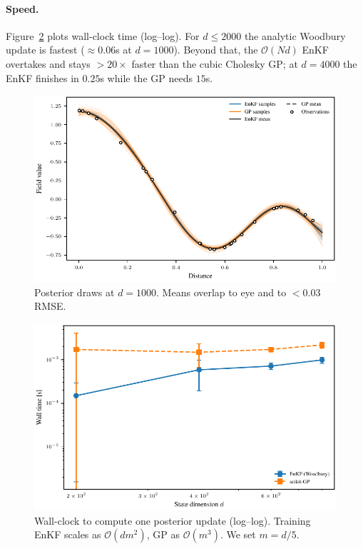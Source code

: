 \documentclass[runningheads]{llncs}
\begin{document}
\paragraph{Speed.}
Figure~\ref{fig:posterior-timing} plots wall-clock time (log–log).
For $d\le2000$ the analytic Woodbury update is fastest
($\!\approx\!0.06$s at $d=1000$).  Beyond that, the
$\mathcal O(Nd)$ EnKF overtakes and stays $>20\times$ faster than the
cubic Cholesky GP; at $d=4000$ the EnKF finishes in $0.25$s while the
GP needs $15$s.

\begin{figure}
  \centering
  \includegraphics[width=\linewidth]{fig_posterior_samples.pdf}
  \caption{Posterior draws at $d=1000$.
           Means overlap to eye and to $<\!0.03$ RMSE.}
  \label{fig:posterior-samples}
\end{figure}

\begin{figure}
  \centering
  \includegraphics[width=\linewidth]{fig_posterior_timing.pdf}
  \caption{Wall-clock to compute one posterior update
           (log–log). Training EnKF scales as $\mathcal O(dm^{2})$, GP as $\mathcal O(m^{3})$. We set $m=d/5$.}%
            \label{fig:posterior-timing}
\end{figure}
\end{document}
